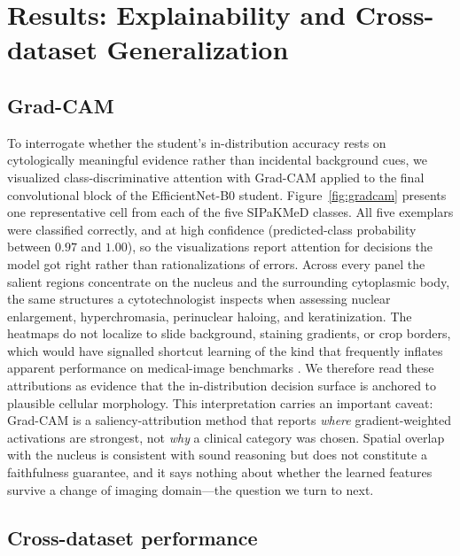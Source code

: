 \section{Results: Explainability and Cross-dataset Generalization}

\subsection{Grad-CAM}

To interrogate whether the student's in-distribution accuracy rests on cytologically meaningful evidence rather than incidental background cues, we visualized class-discriminative attention with Grad-CAM \citep{selvaraju2017gradcam} applied to the final convolutional block of the EfficientNet-B0 student. Figure~\ref{fig:gradcam} presents one representative cell from each of the five SIPaKMeD classes. All five exemplars were classified correctly, and at high confidence (predicted-class probability between $0.97$ and $1.00$), so the visualizations report attention for decisions the model got right rather than rationalizations of errors. Across every panel the salient regions concentrate on the nucleus and the surrounding cytoplasmic body, the same structures a cytotechnologist inspects when assessing nuclear enlargement, hyperchromasia, perinuclear haloing, and keratinization. The heatmaps do not localize to slide background, staining gradients, or crop borders, which would have signalled shortcut learning of the kind that frequently inflates apparent performance on medical-image benchmarks \citep{geirhos2020shortcut}. We therefore read these attributions as evidence that the in-distribution decision surface is anchored to plausible cellular morphology. This interpretation carries an important caveat: Grad-CAM is a saliency-attribution method that reports \emph{where} gradient-weighted activations are strongest, not \emph{why} a clinical category was chosen. Spatial overlap with the nucleus is consistent with sound reasoning but does not constitute a faithfulness guarantee, and it says nothing about whether the learned features survive a change of imaging domain---the question we turn to next.

\subsection{Cross-dataset performance}

